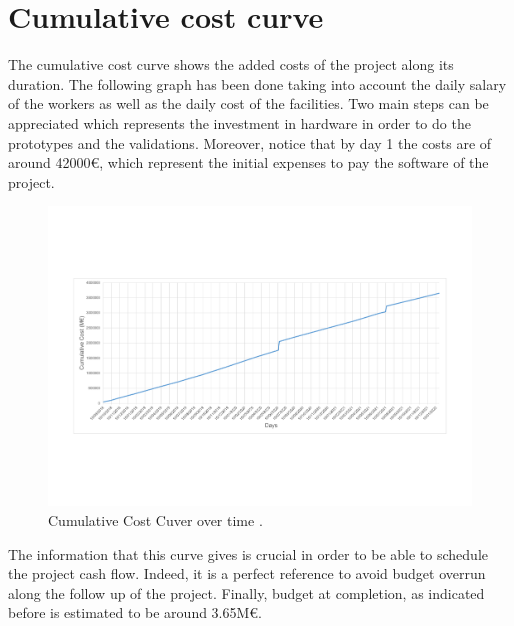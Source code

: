 \section{Cumulative cost curve}

The cumulative cost curve shows the added costs of the project along its duration. The following graph has been done taking into account the daily salary of the workers as well as the daily cost of the facilities. Two main steps can be appreciated which represents the investment in hardware in order to do the prototypes and the validations. Moreover, notice that by day 1 the costs are of around 42000\euro, which represent the initial expenses to pay the software of the project.

\begin{figure}[H]
	\centering
	\includegraphics[width=0.65\linewidth]{./images/CumulativeCost}
	\caption[Cumulative Cost Cuver over time]{Cumulative Cost Cuver over time \cite{workfront2017}.}
	\label{fig:CumulativeCost}
\end{figure} 

The information that this curve gives is crucial in order to be able to schedule the project cash flow. Indeed, it is a perfect reference to avoid budget overrun along the follow up of the project. Finally, budget at completion, as indicated before is estimated to be around 3.65M\euro.